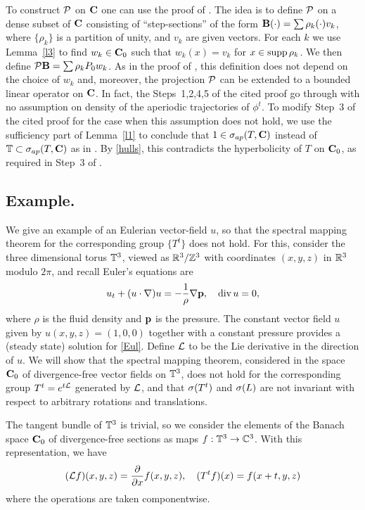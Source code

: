 \begin{pf}
To construct ${\cal P}$ on ${\bold C}$ one 
can use the proof of \cite[Theorem~3.4]{clms}. The idea is 
to define ${\cal{P}}$  on a dense subset of ${\bold C}$ consisting of  
``step-sections''  of
the form ${\bold B}(\cdot)=\sum\rho_k(\cdot)v_k$, where $\{\rho_k\}$ is
a partition of unity, and $v_k$ are given vectors.
For each $k$ we use Lemma~\ref{l3} to find $w_k\in{{\bold C}_0}$ such that 
$w_k(x)=v_k$ for $x\in\operatorname{supp}\rho_k$. We then 
define ${\cal{P}}{\bold B}=\sum\rho_k P_0w_k$. 
As in the proof of \cite[Theorem~3.4]{clms}, 
this definition does not depend on the choice of
$w_k$ and, moreover, the projection ${\cal{P}}$ can be extended to a bounded
linear operator on ${\bold C}$. In fact, 
the Steps~1,2,4,5 of the cited proof go through with no assumption
on density of the aperiodic trajectories of $\phi^t$. To modify Step~3
of the cited proof for the case when this assumption does not hold,
we use the sufficiency part of Lemma~\ref{l1} to conclude that
$1\in\sigma_{ap}(T, {\bold C})$ instead of ${\Bbb{T}}\subset\sigma_{ap}(T,{\bold C})$
as in \cite[Theorem~3.4, Step~3]{clms}. By \eqref{hulls}, this
contradicts the hyperbolicity of $T$ on ${{\bold C}_0}$, as required in
Step~3 of \cite[Theorem~3.4]{clms}.
\end{pf}

\subsection{Example.}
We give an example of an Eulerian vector-field $u$, 
so that the spectral mapping
theorem for the corresponding group $\{T^t\}$ does not hold. For this,
consider the three dimensional torus ${\Bbb{T}}^3$, viewed as ${\Bbb{R}}^3/{\Bbb{Z}}^3$
with coordinates $(x,y,z)$ in ${\Bbb{R}}^3$ modulo $2\pi$, and recall
Euler's equations are 
\begin{equation}\lb{Eul}
u_t+(u\cdot\nabla)u=-\frac{1}{\rho}\nabla {\bold p},\quad \div u=0,
\end{equation}
where $\rho$ is the fluid density and $\bold p$ is the pressure.
The constant
vector field $u$ given by $u(x,y,z)=(1,0,0)$ together with a constant
pressure provides a (steady state) solution for \eqref{Eul}.
Define ${\cal{L}}$ to be the Lie derivative in the direction of $u$.
We will show that the spectral mapping theorem, considered in the
space ${{\bold C}_0}$ of divergence-free vector fields on ${\Bbb{T}}^3$,
does not hold for the 
corresponding group $T^t=e^{t{\cal{L}}}$ generated by ${\cal{L}}$, and 
that $\sigma(T^t)$ and $\sigma(L)$ are not invariant with respect to arbitrary
rotations and translations.

The tangent bundle of ${\Bbb{T}}^3$ is trivial, so we consider 
the elements of the Banach space ${{\bold C}_0}$ of divergence-free sections
as maps $f:{\Bbb{T}}^3\to{\Bbb{C}}^3$. With this representation,
we have
\[
({\cal{L}} f)(x,y,z)=\frac{\partial}{\partial x}f(x,y,z),
\quad (T^tf)(x)=f(x+t,y,z)
\]
where the operations are taken componentwise.

